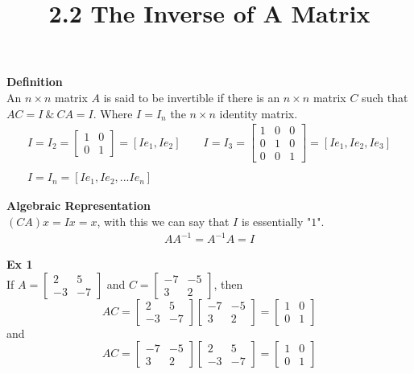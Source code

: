 \documentclass{article}
\title{2.2 The Inverse of A Matrix}
\begin{document}
  \maketitle
  \textbf{Definition}\\
  An $ n \times n $ matrix $ A $ is said to be invertible if there is an $ n \times n $ matrix $ C $ such that $ AC = I ~\&~ CA=I$. Where $ I = I_{n} $ the $ n \times n $ identity matrix. 
  \[
    \begin{gathered}
    I=I_{2} = \begin{bmatrix}
      1 &0\\
      0 &1
    \end{bmatrix} = [Ie_{1},Ie_{2}  ] \qquad
    I = I_{3} = \begin{bmatrix}
      1 &0 &0\\
      0 &1 &0\\
      0 &0 &1
    \end{bmatrix} = [Ie_{1},Ie_{2},Ie_{3}   ]\\
    ~\\
    I=I_{n} = [Ie_{1}, Ie_{2},...Ie_{n}]  
    \end{gathered}
  \]
  
  \textbf{Algebraic Representation}\\
  $ (CA)x = Ix = x $, with this we can say that $ I $ is essentially "$ 1 $". 
  \[
    \begin{gathered}
    AA^{-1} = A^{-1}A = I  
    \end{gathered}
  \]

  \textbf{Ex 1}\\
  If $ A = \begin{bmatrix}
      2 &5\\
      -3 &-7
  \end{bmatrix} $ and $ C = \begin{bmatrix}
      -7 &-5\\
      3 &2
  \end{bmatrix} $, then
  \[
      AC = \begin{bmatrix}
          2 &5\\
          -3 &-7
      \end{bmatrix}
      \begin{bmatrix}
          -7 &-5\\
          3 &2
      \end{bmatrix} = 
      \begin{bmatrix}
          1 &0\\
          0 &1
      \end{bmatrix}
  \]
  and
  \[
      AC=\begin{bmatrix}
          -7 &-5\\
          3 &2
      \end{bmatrix}
      \begin{bmatrix}
          2 &5\\
          -3 &-7
      \end{bmatrix} = 
      \begin{bmatrix}
          1 &0\\
          0 &1
      \end{bmatrix}
  \]
\end{document}
